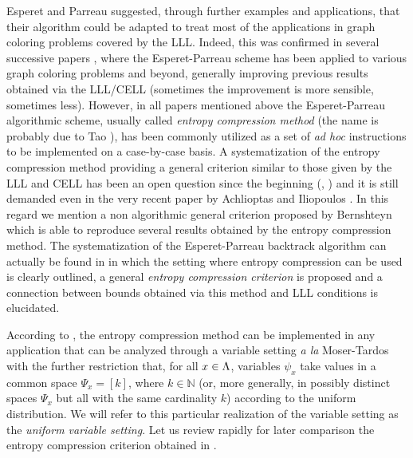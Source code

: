 \documentclass[11pt]{article}
\let\\=\noindent
\let\\=\noindent
\begin{document}
\\Esperet and
Parreau
suggested, through further examples and applications, that their  algorithm   could be adapted  to treat most of the
applications in graph coloring problems covered by the LLL.
Indeed, this was confirmed in several successive  papers   \cite{GMP,Pr,OP,PSS,CR, CLY, SV, FrS, BBCFGM}, where the
Esperet-Parreau scheme has been applied to various
graph coloring problems and beyond, generally improving previous results obtained via the LLL/CELL
(sometimes the improvement is more sensible, sometimes less).
However, in all  papers mentioned above the Esperet-Parreau algorithmic scheme, usually called {\it entropy compression  method} (the name is probably due to Tao \cite{Ta}), has been  commonly
 utilized as  a set of {\it ad hoc} instructions  to be implemented on a case-by-case basis. A systematization of the entropy compression method
 providing a general criterion similar to those given by the LLL and CELL has been an open question since the beginning (\cite{EP}, \cite{GMP}) and it is still demanded even  in the very recent paper by  Achlioptas and Iliopoulos \cite{AI}. In this regard we mention
a non algorithmic general criterion proposed by Bernshteyn \cite{Be} which is able to reproduce several results obtained by the entropy compression method. The systematization of the Esperet-Parreau backtrack algorithm
can actually be found   in  \cite{APS} in which the setting where entropy compression can be used is clearly outlined,
a general
{\it entropy compression criterion} is proposed and  a  connection  between bounds obtained via this method and LLL conditions  is elucidated.



\\According to \cite{APS},  the entropy compression method can be implemented  in any application that can be analyzed through   a variable setting {\it a la} Moser-Tardos  with the further restriction that, for all $x\in \Lambda$,
variables $\psi_x$  take values in a common space $\Psi_x=[k]$, where $k\in \mathbb{N}$
(or, more generally, in possibly distinct spaces $\Psi_x$ but all with the same cardinality $k$)   according to the uniform distribution. We will refer to this particular realization of the variable setting as
the {\it uniform variable setting}. Let us review rapidly for later comparison the
entropy compression criterion obtained in \cite{APS}.
\end{document}
